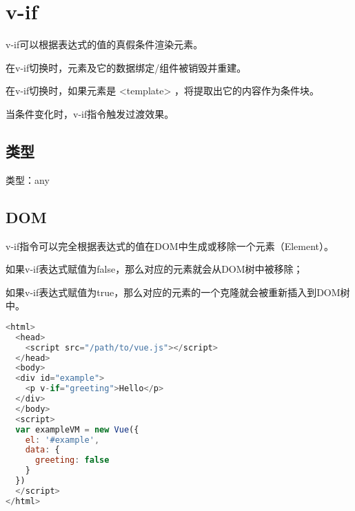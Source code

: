 \begin{lstlisting}[language=JavaScript]

\end{lstlisting}




\begin{lstlisting}[language=JavaScript]

\end{lstlisting}

\section{v-if}

v-if可以根据表达式的值的真假条件渲染元素。

\begin{compactitem}
\item 在v-if切换时，元素及它的数据绑定/组件被销毁并重建。
\item 在v-if切换时，如果元素是 <template> ，将提取出它的内容作为条件块。
\end{compactitem}

当条件变化时，v-if指令触发过渡效果。

\subsection{类型}


\begin{compactitem}
\item 类型：any
\end{compactitem}



\subsection{DOM}

v-if指令可以完全根据表达式的值在DOM中生成或移除一个元素（Element）。

\begin{compactitem}
\item 如果v-if表达式赋值为false，那么对应的元素就会从DOM树中被移除；
\item 如果v-if表达式赋值为true，那么对应的元素的一个克隆就会被重新插入到DOM树中。
\end{compactitem}


\begin{lstlisting}[language=JavaScript]
<html>
  <head>
    <script src="/path/to/vue.js"></script>
  </head>
  <body>
  <div id="example">
    <p v-if="greeting">Hello</p>
  </div>
  </body>
  <script>
  var exampleVM = new Vue({
    el: '#example',
    data: {
      greeting: false
    }
  })
  </script>
</html>
\end{lstlisting}

